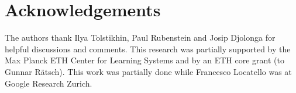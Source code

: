 \documentclass{article}
\begin{document}
\section*{Acknowledgements}
The authors thank Ilya Tolstikhin, Paul Rubenstein and Josip Djolonga for helpful discussions and comments. 
This research was partially supported by the Max Planck ETH Center for Learning Systems and by an ETH core grant (to Gunnar R\"atsch).
This work was partially done while Francesco Locatello was at Google Research Zurich.




\appendix
\onecolumn


\end{document}
